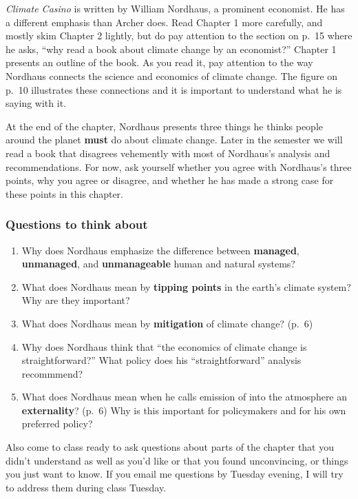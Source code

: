 \documentclass[
]{article}
\providecommand{\tightlist}{%
  \setlength{\itemsep}{0pt}\setlength{\parskip}{0pt}}
\newcommand{\COO}{\ce{CO2}}
\begin{document}
\emph{Climate Casino} is written by William Nordhaus, a prominent
economist. He has a different emphasis than Archer does. Read Chapter 1
more carefully, and mostly skim Chapter 2 lightly, but do pay attention
to the section on p.~15 where he asks, ``why read a book about climate
change by an economist?'' Chapter 1 presents an outline of the book. As
you read it, pay attention to the way Nordhaus connects the science and
economics of climate change. The figure on p.~10 illustrates these
connections and it is important to understand what he is saying with it.

At the end of the chapter, Nordhaus presents three things he thinks
people around the planet \textbf{must} do about climate change. Later in
the semester we will read a book that disagrees vehemently with most of
Nordhaus's analysis and recommendations. For now, ask yourself whether
you agree with Nordhaus's three points, why you agree or disagree, and
whether he has made a strong case for these points in this chapter.

\hypertarget{questions-to-think-about-1}{%
\subsubsection{Questions to think
about}\label{questions-to-think-about-1}}

\begin{enumerate}
\def\labelenumi{\arabic{enumi}.}
\tightlist
\item
  Why does Nordhaus emphasize the difference between \textbf{managed},
  \textbf{unmanaged}, and \textbf{unmanageable} human and natural
  systems?
\item
  What does Nordhaus mean by \textbf{tipping points} in the earth's
  climate system? Why are they important?
\item
  What does Nordhaus mean by \textbf{mitigation} of climate change?
  (p.~6)
\item
  Why does Nordhaus think that ``the economics of climate change is
  straightforward?'' What policy does his ``straightforward'' analysis
  recommmend?
\item
  What does Nordhaus mean when he calls emission of \COO{} into the
  atmosphere an \textbf{externality}? (p.~6) Why is this important for
  policymakers and for his own preferred policy?
\end{enumerate}

Also come to class ready to ask questions about parts of the chapter
that you didn't understand as well as you'd like or that you found
unconvincing, or things you just want to know. If you email me questions
by Tuesday evening, I will try to address them during class Tuesday.
\end{document}

